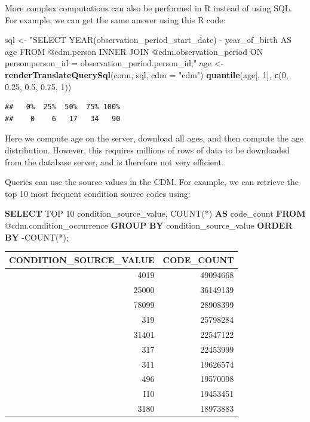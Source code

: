 \documentclass[]{book}
\newenvironment{Shaded}{\begin{snugshade}}{\end{snugshade}}
\newcommand{\KeywordTok}[1]{\textcolor[rgb]{0.13,0.29,0.53}{\textbf{#1}}}
\newcommand{\DataTypeTok}[1]{\textcolor[rgb]{0.13,0.29,0.53}{#1}}
\newcommand{\DecValTok}[1]{\textcolor[rgb]{0.00,0.00,0.81}{#1}}
\newcommand{\FloatTok}[1]{\textcolor[rgb]{0.00,0.00,0.81}{#1}}
\newcommand{\StringTok}[1]{\textcolor[rgb]{0.31,0.60,0.02}{#1}}
\newcommand{\FunctionTok}[1]{\textcolor[rgb]{0.00,0.00,0.00}{#1}}
\newcommand{\NormalTok}[1]{#1}
\begin{document}
More complex computations can also be performed in R instead of using
SQL. For example, we can get the same answer using this R code:

\begin{Shaded}
\begin{Highlighting}[]
\NormalTok{sql <-}\StringTok{ "SELECT YEAR(observation_period_start_date) -}
\StringTok{               year_of_birth AS age}
\StringTok{FROM @cdm.person}
\StringTok{INNER JOIN @cdm.observation_period}
\StringTok{  ON person.person_id = observation_period.person_id;"}
\NormalTok{age <-}\StringTok{ }\KeywordTok{renderTranslateQuerySql}\NormalTok{(conn, sql, }\DataTypeTok{cdm =} \StringTok{"cdm"}\NormalTok{)}
\KeywordTok{quantile}\NormalTok{(age[, }\DecValTok{1}\NormalTok{], }\KeywordTok{c}\NormalTok{(}\DecValTok{0}\NormalTok{, }\FloatTok{0.25}\NormalTok{, }\FloatTok{0.5}\NormalTok{, }\FloatTok{0.75}\NormalTok{, }\DecValTok{1}\NormalTok{))}
\end{Highlighting}
\end{Shaded}

\begin{verbatim}
##   0%  25%  50%  75% 100% 
##    0    6   17   34   90
\end{verbatim}

Here we compute age on the server, download all ages, and then compute
the age distribution. However, this requires millions of rows of data to
be downloaded from the database server, and is therefore not very
efficient.

Queries can use the source values in the CDM. For example, we can
retrieve the top 10 most frequent condition source codes using:

\begin{Shaded}
\begin{Highlighting}[]
\KeywordTok{SELECT}\NormalTok{ TOP }\DecValTok{10}\NormalTok{ condition_source_value, }
  \FunctionTok{COUNT}\NormalTok{(*) }\KeywordTok{AS}\NormalTok{ code_count}
\KeywordTok{FROM}\NormalTok{ @cdm.condition_occurrence}
\KeywordTok{GROUP} \KeywordTok{BY}\NormalTok{ condition_source_value}
\KeywordTok{ORDER} \KeywordTok{BY}\NormalTok{ -COUNT(*);}
\end{Highlighting}
\end{Shaded}

\begin{longtable}[]{@{}rr@{}}
\toprule
CONDITION\_SOURCE\_VALUE & CODE\_COUNT\tabularnewline
\midrule
\endhead
4019 & 49094668\tabularnewline
25000 & 36149139\tabularnewline
78099 & 28908399\tabularnewline
319 & 25798284\tabularnewline
31401 & 22547122\tabularnewline
317 & 22453999\tabularnewline
311 & 19626574\tabularnewline
496 & 19570098\tabularnewline
I10 & 19453451\tabularnewline
3180 & 18973883\tabularnewline
\bottomrule
\end{longtable}
\end{document}
